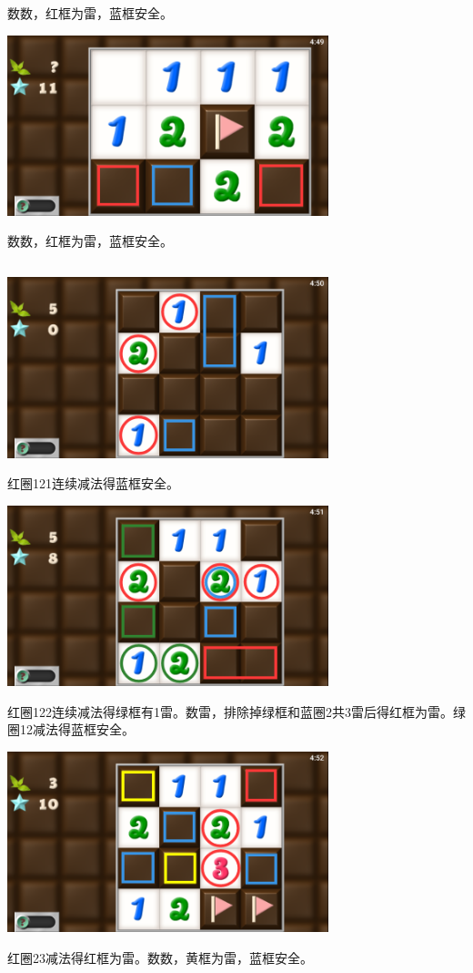 数数，红框为雷，蓝框安全。
\begin{center}
    \includegraphics[width=0.7\textwidth]{puzzle/72-5.png}
\end{center}
数数，红框为雷，蓝框安全。

\subsection{} %
\begin{center}
    \includegraphics[width=0.7\textwidth]{puzzle/73-1.png}
\end{center}
红圈121连续减法得蓝框安全。
\begin{center}
    \includegraphics[width=0.7\textwidth]{puzzle/73-2.png}
\end{center}
红圈122连续减法得绿框有1雷。数雷，排除掉绿框和蓝圈2共3雷后得红框为雷。绿圈12减法得蓝框安全。
\begin{center}
    \includegraphics[width=0.7\textwidth]{puzzle/73-3.png}
\end{center}
红圈23减法得红框为雷。数数，黄框为雷，蓝框安全。

